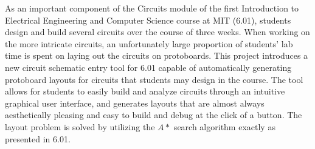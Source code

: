 % 
% 
%

As an important component of the Circuits module of the first Introduction to
Electrical Engineering and Computer Science course at MIT (6.01), students
design and
build several circuits over the course of three weeks. When working on the
more intricate circuits, an unfortunately large proportion of students' lab time
is spent on laying out the circuits on protoboards. This project introduces a
new circuit schematic entry tool for 6.01 capable of automatically generating
protoboard layouts for circuits that students may design in the course. The tool
allows for students to easily build and analyze circuits through an intuitive
graphical user interface, and generates layouts that are almost always
aesthetically pleasing and easy to build and debug at the click of a button.
The layout problem is solved by utilizing the $A*$ search algorithm exactly as
presented in 6.01.
